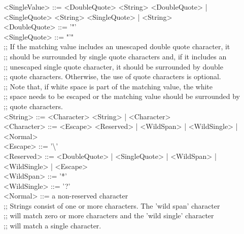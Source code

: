 \settowidth{\utilLen}{<SingleValue> ::= }%
<SingleValue> ::= <DoubleQuote> <String> <DoubleQuote> |\\
\hspace*{\utilLen}<SingleQuote> <String> <SingleQuote> | <String>\\
<DoubleQuote> ::= '"'\\
<SingleQuote> ::= "'"\\
;; If the matching value includes an unescaped double quote character, it\\
;; should be surrounded by single quote characters and, if it includes an\\
;; unescaped single quote character, it should be surrounded by double\\
;; quote characters. Otherwise, the use of quote characters is optional.\\
;; Note that, if white space is part of the matching value, the white\\
;; space needs to be escaped or the matching value should be surrounded by\\
;; quote characters.\\
\newpage
<String> ::= <Character> <String> | <Character>\\
\settowidth{\utilLen}{<Character> ::= }%
<Character> ::= <Escape> <Reserved> | <WildSpan> | <WildSingle> |\\
\hspace*{\utilLen}<Normal>\\
<Escape> ::= '\textbackslash'\\
\settowidth{\utilLen}{<Reserved> ::= }%
<Reserved> ::= <DoubleQuote> | <SingleQuote> | <WildSpan> |\\
\hspace*{\utilLen}<WildSingle> | <Escape>\\
<WildSpan> ::= '*'\\
<WildSingle> ::= '?'\\
<Normal> ::= a non-reserved character\\
;; Strings consist of one or more characters. The 'wild span' character\\
;; will match zero or more characters and the 'wild single' character\\
;; will match a single character.
\outputEnd{}
\appendixEnd{}
